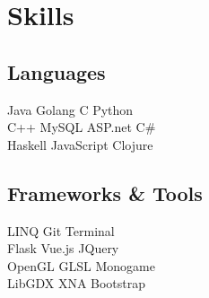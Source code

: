 \documentclass[]{deedy-resume-openfont}
\begin{document}
\begin{minipage}[t]{0.33\textwidth}

\section{Skills}
\subsection{Languages}
Java \textbullet{} Golang \textbullet{} C \textbullet{} Python \\
C++ \textbullet{} MySQL \textbullet{} ASP.net  \textbullet{} C\# \\ 
Haskell \textbullet{} JavaScript  \textbullet{} Clojure \\
\sectionsep
\sectionsep
\subsection{Frameworks \& Tools}
LINQ\textbullet{}  Git  \textbullet{} Terminal\\
Flask\textbullet{} Vue.js\textbullet{} JQuery \\ 
OpenGL \textbullet{} GLSL \textbullet{} Monogame \\
LibGDX \textbullet{} XNA \textbullet{} Bootstrap\\
\sectionsep



%
%

\end{minipage} 
\hfill
\end{document}
